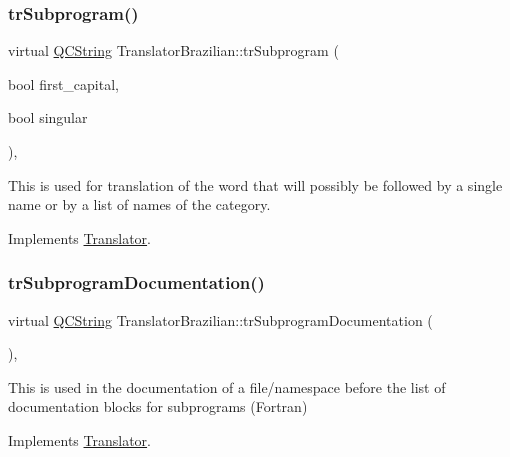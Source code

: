 \mbox{\label{class_translator_brazilian_a9d95cf381524c31b416714a2a62fea29}} 
\subsubsection{\texorpdfstring{trSubprogram()}{trSubprogram()}}
{\footnotesize\ttfamily virtual \mbox{\hyperlink{class_q_c_string}{Q\+C\+String}} Translator\+Brazilian\+::tr\+Subprogram (\begin{DoxyParamCaption}\item[{bool}]{first\+\_\+capital,  }\item[{bool}]{singular }\end{DoxyParamCaption})\hspace{0.3cm}{\ttfamily [inline]}, {\ttfamily [virtual]}}

This is used for translation of the word that will possibly be followed by a single name or by a list of names of the category. 

Implements \mbox{\hyperlink{class_translator}{Translator}}.

\mbox{\label{class_translator_brazilian_a8de9123e2b845de096990e996c543765}} 
\subsubsection{\texorpdfstring{trSubprogramDocumentation()}{trSubprogramDocumentation()}}
{\footnotesize\ttfamily virtual \mbox{\hyperlink{class_q_c_string}{Q\+C\+String}} Translator\+Brazilian\+::tr\+Subprogram\+Documentation (\begin{DoxyParamCaption}{ }\end{DoxyParamCaption})\hspace{0.3cm}{\ttfamily [inline]}, {\ttfamily [virtual]}}

This is used in the documentation of a file/namespace before the list of documentation blocks for subprograms (Fortran) 

Implements \mbox{\hyperlink{class_translator}{Translator}}.

